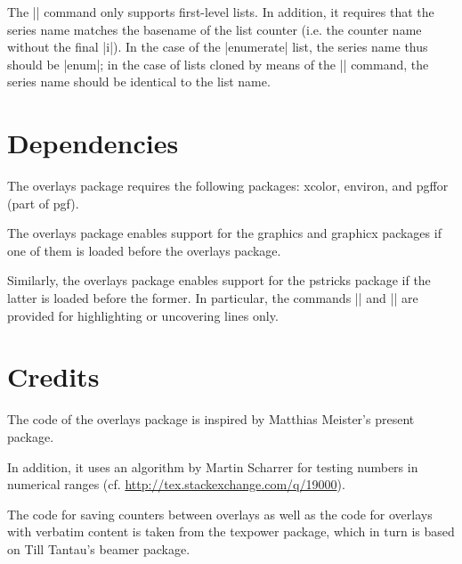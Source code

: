 \documentclass[a4paper]{ltxdoc}
\begin{document}
The |\saveseriesbetweenoverlays| command only supports first-level lists. In
addition, it requires that the series name matches the basename of the list
counter (i.e. the counter name without the final |i|). In the case of the
|enumerate| list, the series name thus should be |enum|; in the case of lists
cloned by means of the |\newlist| command, the series name should be identical
to the list name.

\section{Dependencies}

The \textsf{overlays} package requires the following packages: \textsf{xcolor},
\textsf{environ}, and \textsf{pgffor} (part of \textsf{pgf}).

The \textsf{overlays} package enables support for the \textsf{graphics} and
\textsf{graphicx} packages if one of them is loaded before the \textsf{overlays}
package.

\DescribeMacro{\psalert}
\DescribeMacro{\psvisible}
Similarly, the \textsf{overlays} package enables support for the
\textsf{pstricks} package if the latter is loaded before the former. In
particular, the commands |\psalert| and |\psvisible| are provided for
highlighting or uncovering lines only.

\section{Credits}

The code of the \textsf{overlays} package is inspired by Matthias Meister's
\textsf{present} package.

In addition, it uses an algorithm by Martin Scharrer for testing numbers in
numerical ranges (cf. \url{http://tex.stackexchange.com/q/19000}).

The code for saving counters between overlays as well as the code for overlays
with verbatim content is taken from the \textsf{texpower} package, which in turn
is based on Till Tantau's \textsf{beamer} package.
\end{document}
